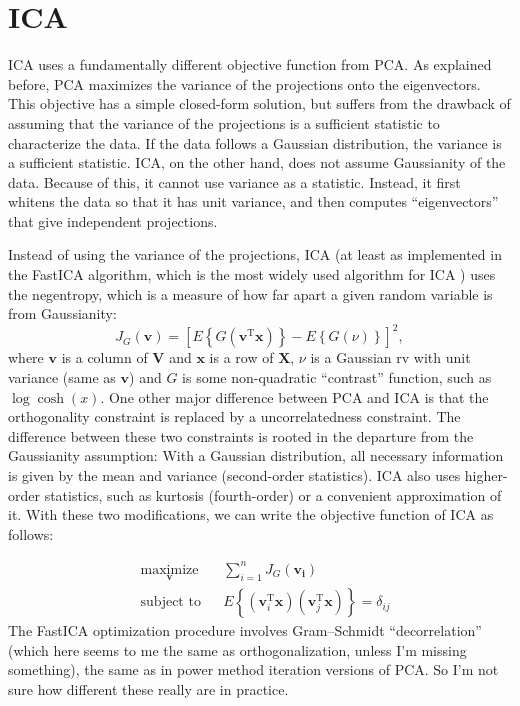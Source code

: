 \documentclass{article}
\newcommand{\transpose}{^\mathrm{T}}
\begin{document}
\section*{ICA}
ICA uses a fundamentally different objective function from PCA. As explained before,  PCA maximizes the variance of the projections onto the eigenvectors.  This objective has a simple closed-form solution, but suffers from the drawback of assuming that the variance of the projections is a sufficient statistic to characterize the data.  If the data follows a Gaussian distribution, the variance is a sufficient statistic.  ICA, on the other hand, does not assume Gaussianity of the data.  Because of this, it cannot use variance as a statistic.  Instead, it first whitens the data so that it has unit variance, and then computes ``eigenvectors'' that give independent projections. 

Instead of using the variance of the projections, ICA (at least as implemented in the FastICA algorithm, which is the most widely used algorithm for ICA \cite{hyvarinen_fast_1999,hyvarinen_independent_2000}) uses the negentropy, which is a measure of how far apart a given random variable is from Gaussianity: 
\begin{equation}
J_G \left( \mathbf{v}\right) = \left[ E \left\lbrace G \left( \mathbf{v}\transpose \mathbf{x}\right) \right\rbrace - E \left\lbrace G \left( \nu \right) \right\rbrace \right]^2,
\end{equation}
where $\mathbf{v}$ is a column of $\mathbf{V}$ and $\mathbf{x}$ is a row of $\mathbf{X}$,  $\nu$ is a Gaussian rv with unit variance (same as $\mathbf{v}$) and $G$ is some non-quadratic  ``contrast'' function, such as $\log \cosh (x)$. One other major difference between PCA and ICA is that the orthogonality constraint is replaced by a uncorrelatedness constraint.  The difference between these two constraints is rooted in the departure from the Gaussianity assumption:  With a Gaussian distribution, all necessary information is given by the mean and variance (second-order statistics).  ICA also uses higher-order statistics, such as kurtosis (fourth-order) or a convenient approximation of it.  With these two modifications, we can write the objective function of ICA as follows:

 \begin{equation}
\begin{aligned}
&\underset{\mathbf{v}}{\text{maximize}} && \sum_{i=1}^n J_G \left( \mathbf{v_i} \right) \\ 
& \text{subject to} & & E \left\lbrace \left( \mathbf{v}_i\transpose \mathbf{x} \right) \left( \mathbf{v}_j\transpose \mathbf{x} \right) \right\rbrace = \delta_{ij}
\end{aligned}
\end{equation}
The FastICA optimization procedure involves Gram--Schmidt ``decorrelation'' (which here seems to me the same as orthogonalization, unless I'm missing something), the same as in power method iteration versions of PCA.  So I'm not sure how different these really are in practice.



\end{document}
